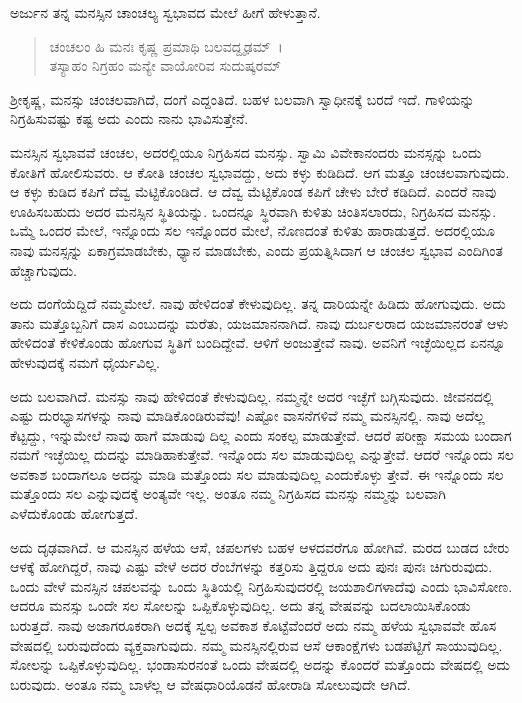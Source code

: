 ಅರ್ಜುನ ತನ್ನ ಮನಸ್ಸಿನ ಚಾಂಚಲ್ಯ ಸ್ವಭಾವದ ಮೇಲೆ ಹೀಗೆ ಹೇಳುತ್ತಾನೆ.

\begin{verse}
ಚಂಚಲಂ ಹಿ ಮನಃ ಕೃಷ್ಣ ಪ್ರಮಾಥಿ ಬಲವದ್ದೃಢಮ್~।\\ತಸ್ಯಾಹಂ ನಿಗ್ರಹಂ ಮನ್ಯೇ ವಾಯೋರಿವ ಸುದುಷ್ಕರಮ್ 
\end{verse}

{\small ಶ‍್ರೀಕೃಷ್ಣ, ಮನಸ್ಸು ಚಂಚಲವಾಗಿದೆ, ದಂಗೆ ಎದ್ದಂತಿದೆ. ಬಹಳ ಬಲವಾಗಿ ಸ್ವಾಧೀನಕ್ಕೆ ಬರದೆ ಇದೆ. ಗಾಳಿಯನ್ನು ನಿಗ್ರಹಿಸುವಷ್ಟು ಕಷ್ಟ ಅದು ಎಂದು ನಾನು ಭಾವಿಸುತ್ತೇನೆ.}

ಮನಸ್ಸಿನ ಸ್ವಭಾವವೆ ಚಂಚಲ, ಅದರಲ್ಲಿಯೂ ನಿಗ್ರಹಿಸದ ಮನಸ್ಸು. ಸ್ವಾಮಿ ವಿವೇಕಾನಂದರು ಮನಸ್ಸನ್ನು ಒಂದು ಕೋತಿಗೆ ಹೋಲಿಸುವರು. ಆ ಕೋತಿ ಚಂಚಲ ಸ್ವಭಾವದ್ದು, ಅದು ಕಳ್ಳು ಕುಡಿದಿದೆ. ಆಗ ಮತ್ತೂ ಚಂಚಲವಾಗುವುದು. ಆ ಕಳ್ಳು ಕುಡಿದ ಕಪಿಗೆ ದೆವ್ವ ಮೆಟ್ಟಿಕೊಂಡಿದೆ. ಆ ದೆವ್ವ ಮೆಟ್ಟಿಕೊಂಡ ಕಪಿಗೆ ಚೇಳು ಬೇರೆ ಕಡಿದಿದೆ. ಎಂದರೆ ನಾವು ಊಹಿಸಬಹುದು ಅದರ ಮನಸ್ಸಿನ ಸ್ಥಿತಿಯನ್ನು. ಒಂದನ್ನೂ ಸ್ಥಿರವಾಗಿ ಕುಳಿತು ಚಿಂತಿಸಲಾರದು, ನಿಗ್ರಹಿಸದ ಮನಸ್ಸು. ಒಮ್ಮೆ ಒಂದರ ಮೇಲೆ, ಇನ್ನೊಂದು ಸಲ ಇನ್ನೊಂದರ ಮೇಲೆ, ನೊಣದಂತೆ ಕುಳಿತು ಹಾರಾಡುತ್ತದೆ. ಅದರಲ್ಲಿಯೂ ನಾವು ಮನಸ್ಸನ್ನು ಏಕಾಗ್ರಮಾಡಬೇಕು, ಧ್ಯಾನ ಮಾಡಬೇಕು, ಎಂದು ಪ್ರಯತ್ನಿಸಿದಾಗ ಆ ಚಂಚಲ ಸ್ವಭಾವ ಎಂದಿಗಿಂತ ಹೆಚ್ಚಾಗುವುದು.

ಅದು ದಂಗೆಯೆದ್ದಿದೆ ನಮ್ಮಮೇಲೆ. ನಾವು ಹೇಳಿದಂತೆ ಕೇಳುವುದಿಲ್ಲ. ತನ್ನ ದಾರಿಯನ್ನೇ ಹಿಡಿದು ಹೋಗುವುದು. ಅದು ತಾನು ಮತ್ತೊಬ್ಬನಿಗೆ ದಾಸ ಎಂಬುದನ್ನು ಮರೆತು, ಯಜಮಾನನಾಗಿದೆ. ನಾವು ದುರ್ಬಲರಾದ ಯಜಮಾನರಂತೆ ಆಳು ಹೇಳಿದಂತೆ ಕೇಳಿಕೊಂಡು ಹೋಗುವ ಸ್ಥಿತಿಗೆ ಬಂದಿದ್ದೇವೆ. ಆಳಿಗೆ ಅಂಜುತ್ತೇವೆ ನಾವು. ಅವನಿಗೆ ಇಚ್ಛೆಯಿಲ್ಲದ ಏನನ್ನೂ ಹೇಳುವುದಕ್ಕೆ ನಮಗೆ ಧೈರ್ಯವಿಲ್ಲ.

ಅದು ಬಲವಾಗಿದೆ. ಮನಸ್ಸು ನಾವು ಹೇಳಿದಂತೆ ಕೇಳುವುದಿಲ್ಲ. ನಮ್ಮನ್ನೇ ಅದರ ಇಚ್ಛೆಗೆ ಬಗ್ಗಿಸುವುದು. ಜೀವನದಲ್ಲಿ ಎಷ್ಟು ದುರಭ್ಯಾಸಗಳನ್ನು ನಾವು ಮಾಡಿಕೊಂಡಿರುವೆವು! ಎಷ್ಟೋ ವಾಸನೆಗಳಿವೆ ನಮ್ಮ ಮನಸ್ಸಿನಲ್ಲಿ. ನಾವು ಅದೆಲ್ಲ ಕೆಟ್ಟದ್ದು, ಇನ್ನುಮೇಲೆ ನಾವು ಹಾಗೆ ಮಾಡುವು ದಿಲ್ಲ ಎಂದು ಸಂಕಲ್ಪ ಮಾಡುತ್ತೇವೆ. ಆದರೆ ಪರೀಕ್ಷಾ ಸಮಯ ಬಂದಾಗ ನಮಗೆ ಇಚ್ಛೆಯಿಲ್ಲ ದುದನ್ನು ಮಾಡಿಹಾಕುತ್ತೇವೆ. ಇನ್ನೊಂದು ಸಲ ಮಾಡುವುದಿಲ್ಲ ಎನ್ನುತ್ತೇವೆ. ಆದರೆ ಇನ್ನೊಂದು ಸಲ ಅವಕಾಶ ಬಂದಾಗಲೂ ಅದನ್ನು ಮಾಡಿ ಮತ್ತೊಂದು ಸಲ ಮಾಡುವುದಿಲ್ಲ ಎಂದುಕೊಳ್ಳು ತ್ತೇವೆ. ಈ ಇನ್ನೊಂದು ಸಲ ಮತ್ತೊಂದು ಸಲ ಎನ್ನುವುದಕ್ಕೆ ಅಂತ್ಯವೇ ಇಲ್ಲ. ಅಂತೂ ನಮ್ಮ ನಿಗ್ರಹಿಸದ ಮನಸ್ಸು ನಮ್ಮನ್ನು ಬಲವಾಗಿ ಎಳೆದುಕೊಂಡು ಹೋಗುತ್ತದೆ.

ಅದು ದೃಢವಾಗಿದೆ. ಆ ಮನಸ್ಸಿನ ಹಳೆಯ ಆಸೆ, ಚಪಲಗಳು ಬಹಳ ಆಳದವರೆಗೂ ಹೋಗಿವೆ. ಮರದ ಬುಡದ ಬೇರು ಆಳಕ್ಕೆ ಹೋಗಿದ್ದರೆ, ನಾವು ಎಷ್ಟು ವೇಳೆ ಅದರ ರೆಂಬೆಗಳನ್ನು ಕತ್ತರಿಸು ತ್ತಿದ್ದರೂ ಅದು ಪುನಃ ಪುನಃ ಚಿಗುರುವುದು. ಒಂದು ವೇಳೆ ಮನಸ್ಸಿನ ಚಪಲವನ್ನು ಒಂದು ಸ್ಥಿತಿಯಲ್ಲಿ ನಿಗ್ರಹಿಸುವುದರಲ್ಲಿ ಜಯಶಾಲಿಗಳಾದೆವು ಎಂದು ಭಾವಿಸೋಣ. ಆದರೂ ಮನಸ್ಸು ಒಂದೇ ಸಲ ಸೋಲನ್ನು ಒಪ್ಪಿಕೊಳ್ಳುವುದಿಲ್ಲ. ಅದು ತನ್ನ ವೇಷವನ್ನು ಬದಲಾಯಿಸಿಕೊಂಡು ಬರುತ್ತದೆ. ನಾವು ಅಜಾಗರೂಕರಾಗಿ ಅದಕ್ಕೆ ಸ್ವಲ್ಪ ಅವಕಾಶ ಕೊಟ್ಟೆವೆಂದರೆ ಅದು ನಮ್ಮ ಹಳೆಯ ಸ್ವಭಾವವೇ ಹೊಸ ವೇಷದಲ್ಲಿ ಬರುವುದೆಂದು ವ್ಯಕ್ತವಾಗುವುದು. ನಮ್ಮ ಮನಸ್ಸಿನಲ್ಲಿರುವ ಆಸೆ ಆಕಾಂಕ್ಷೆಗಳು ಬಡಪೆಟ್ಟಿಗೆ ಸಾಯುವುದಿಲ್ಲ. ಸೋಲನ್ನು ಒಪ್ಪಿಕೊಳ್ಳುವುದಿಲ್ಲ. ಭಂಡಾಸುರನಂತೆ ಒಂದು ವೇಷದಲ್ಲಿ ಅದನ್ನು ಕೊಂದರೆ ಮತ್ತೊಂದು ವೇಷದಲ್ಲಿ ಅದು ಬರುವುದು. ಅಂತೂ ನಮ್ಮ ಬಾಳೆಲ್ಲ ಆ ವೇಷಧಾರಿಯೊಡನೆ ಹೋರಾಡಿ ಸೋಲುವುದೇ ಆಗಿದೆ.

